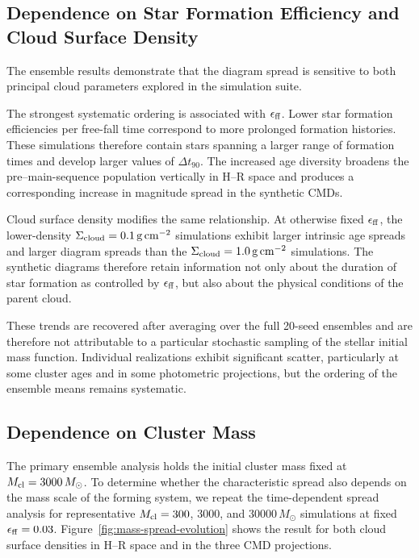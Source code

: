 \documentclass[linenumbers, twocolumn]{aastex631}
\begin{document}
\subsection{Dependence on Star Formation Efficiency and Cloud Surface Density}
The ensemble results demonstrate that the diagram spread is sensitive to both principal cloud parameters explored in the simulation suite.

The strongest systematic ordering is associated with $\epsilon_{\rm ff}$. Lower star formation efficiencies per free-fall time correspond to more prolonged formation histories. These simulations therefore contain stars spanning a larger range of formation times and develop larger values of $\Delta t_{90}$. The increased age diversity broadens the pre--main-sequence population vertically in H--R space and produces a corresponding increase in magnitude spread in the synthetic CMDs.

Cloud surface density modifies the same relationship. At otherwise fixed $\epsilon_{\rm ff}$, the lower-density $\Sigma_{\rm cloud}=0.1\,{\rm g\,cm^{-2}}$ simulations exhibit larger intrinsic age spreads and larger diagram spreads than the $\Sigma_{\rm cloud}=1.0\,{\rm g\,cm^{-2}}$ simulations. The synthetic diagrams therefore retain information not only about the duration of star formation as controlled by $\epsilon_{\rm ff}$, but also about the physical conditions of the parent cloud.

These trends are recovered after averaging over the full 20-seed ensembles and are therefore not attributable to a particular stochastic sampling of the stellar initial mass function. Individual realizations exhibit significant scatter, particularly at some cluster ages and in some photometric projections, but the ordering of the ensemble means remains systematic.

\subsection{Dependence on Cluster Mass}
\label{sec:mass-results}

The primary ensemble analysis holds the initial cluster mass fixed at $M_{\rm cl}=3000\,M_\odot$. To determine whether the characteristic spread also depends on the mass scale of the forming system, we repeat the time-dependent spread analysis for representative $M_{\rm cl}=300$, $3000$, and $30000\,M_\odot$ simulations at fixed $\epsilon_{\rm ff}=0.03$. Figure~\ref{fig:mass-spread-evolution} shows the result for both cloud surface densities in H--R space and in the three CMD projections.
\end{document}
